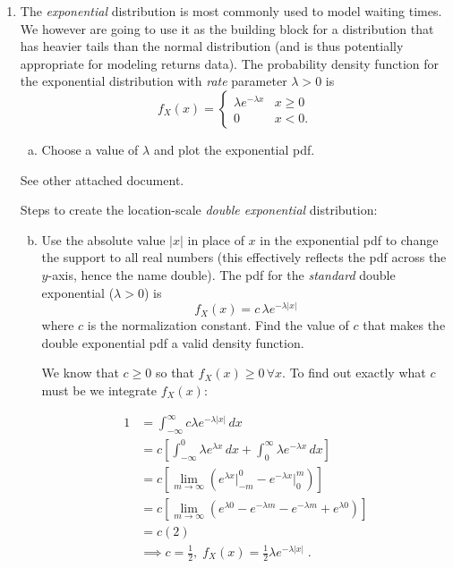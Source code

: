 \documentclass[letterpaper,12pt,fleqn]{article}
\begin{document}
\begin{enumerate}
\vspace{2em}

\item The \emph{exponential} distribution is most commonly used to model waiting times. We however are going to use it as the building block for a distribution that has heavier tails than the normal distribution (and is thus potentially appropriate for modeling returns data).  The probability density function for the exponential distribution with \emph{rate} parameter $\lambda > 0$ is
\begin{equation*}
f_{X}(x) = \begin{cases} \lambda e^{-\lambda x} & x \geq 0 \\ 0 & x < 0. \end{cases}
\end{equation*}


\begin{enumerate}[a)]
\item Choose a value of $\lambda$ and plot the exponential pdf.
\end{enumerate}

See other attached document.

Steps to create the location-scale \emph{double exponential} distribution:

\begin{enumerate}[a)]
\setcounter{enumii}{1}
\item Use the absolute value $|x|$ in place of $x$ in the exponential pdf to change the support to all real numbers (this effectively reflects the pdf across the $y$-axis, hence the name double). The pdf for the \emph{standard} double exponential ($\lambda > 0$) is
\begin{equation*}
f_{X}(x) = c \, \lambda e^{-\lambda |x|}
\end{equation*}
where $c$ is the normalization constant. Find the value of $c$ that makes the double exponential pdf a valid density function.

We know that $c \geq 0$ so that $f_X(x) \geq 0 \, \forall x$. To find out exactly what $c$ must be we integrate $f_X(x)$:

\begin{align*}
1 &= \int_{-\infty}^{\infty} c \lambda e^{-\lambda |x|} \, dx \\ &= c\left[\int_{-\infty}^{0} \lambda e^{\lambda x} \, dx + \int_{0}^{\infty} \lambda e^{-\lambda x} \, dx\right] \\
&= c\left[ \lim_{m\to\infty} \left( e^{\lambda x} \rvert_{-m}^{0} - e^{-\lambda x} \rvert_{0}^{m} \right) \right] \\
&= c\left[ \lim_{m\to\infty} \left( e^{\lambda 0} - e^{-\lambda m} - e^{-\lambda m} + e^{\lambda 0} \right) \right] \\ &= c(2) \\
& \implies c = \frac{1}{2} ,\; f_X(x) = \frac{1}{2} \lambda e^{-\lambda |x|}\;.
\end{align*}


\end{enumerate}
\end{enumerate}
\end{document}
